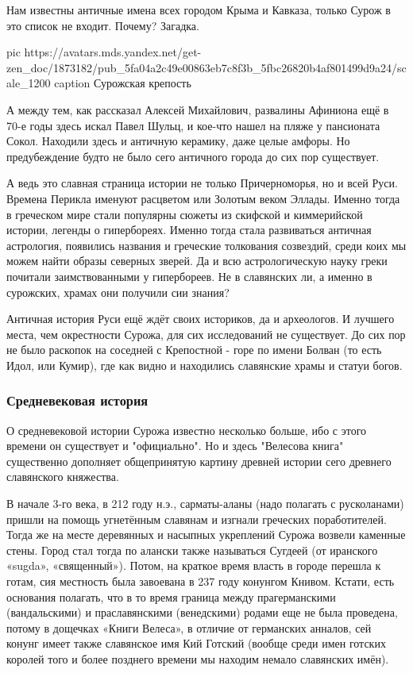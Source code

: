 Нам известны античные имена всех городом Крыма и Кавказа, только Сурож в это
список не входит. Почему? Загадка.

\ifcmt
  pic https://avatars.mds.yandex.net/get-zen_doc/1873182/pub_5fa04a2c49e00863eb7c8f3b_5fbc26820b4af801499d9a24/scale_1200
	caption Сурожская крепость
\fi

А между тем, как рассказал Алексей Михайлович, развалины Афиниона ещё в 70-е
годы здесь искал Павел Шульц, и кое-что нашел на пляже у пансионата Сокол.
Находили здесь и античную керамику, даже целые амфоры. Но предубеждение будто
не было сего античного города до сих пор существует.

А ведь это славная страница истории не только Причерноморья, но и всей Руси.
Времена Перикла именуют расцветом или Золотым веком Эллады. Именно тогда в
греческом мире стали популярны сюжеты из скифской и киммерийской истории,
легенды о гипербореях. Именно тогда стала развиваться античная астрология,
появи­лись названия и греческие толкования созвездий, среди коих мы можем найти
образы северных зверей. Да и всю астрологическую науку греки почитали
заимствованными у гипербореев. Не в славянских ли, а именно в сурожских, храмах
они получили сии знания?

Античная история Руси ещё ждёт своих историков, да и археологов. И лучшего
места, чем окрестности Сурожа, для сих исследований не су­ще­ствует. До сих пор
не было раскопок на соседней с Крепостной - горе по имени Болван (то есть Идол,
или Кумир), где как видно и находились славянские храмы и статуи богов.

\subsubsection{Средневековая история}

О средневековой истории Сурожа известно несколько больше, ибо с этого времени
он существует и "официально". Но и здесь "Велесова книга" существенно дополняет
общепринятую картину древней истории сего древнего славянского княжества.

В начале 3-го века, в 212 году н.э., сарматы-аланы (надо полагать с
русколанами) пришли на помощь угнетённым славянам и изгнали греческих
поработителей. Тогда же на месте деревянных и насыпных укреплений Сурожа
возвели каменные стены. Город стал тогда по алански также называться Сугдеей
(от иранского «sugda», «священный»). Потом, на краткое время власть в городе
перешла к готам, сия местность была завоевана в 237 году конунгом Книвом.
Кстати, есть основания полагать, что в то время граница между прагерманскими
(вандальскими) и пра­славянскими (венедскими) родами еще не была проведена,
потому в дощечках «Книги Велеса», в отличие от германских анналов, сей конунг
имеет также славянское имя Кий Готский (вообще среди имен готских королей того
и более позднего времени мы находим немало славянских имён).

